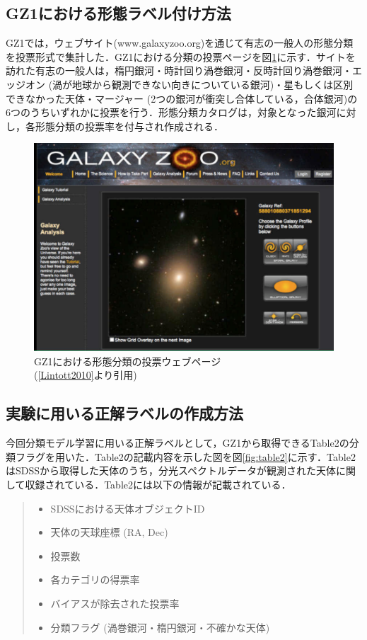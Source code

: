 \documentclass[a4j, 11pt]{jreport}
\begin{document}
\subsection*{GZ1における形態ラベル付け方法}
GZ1では，ウェブサイト(www.galaxyzoo.org)を通じて有志の一般人の形態分類を投票形式で集計した．GZ1における分類の投票ページを図\ref{fig:gz1_website}に示す．サイトを訪れた有志の一般人は，楕円銀河・時計回り渦巻銀河・反時計回り渦巻銀河・エッジオン (渦が地球から観測できない向きについている銀河)・星もしくは区別できなかった天体・マージャー (2つの銀河が衝突し合体している，合体銀河)の6つのうちいずれかに投票を行う．形態分類カタログは，対象となった銀河に対し，各形態分類の投票率を付与され作成される．

\begin{figure}[h]
 \centering
 \includegraphics[width=12cm]{images/gz1_website.png}
 \caption{GZ1における形態分類の投票ウェブページ\\(\ref{Lintott2010}より引用)}
 \label{fig:gz1_website}
\end{figure}

\subsection*{実験に用いる正解ラベルの作成方法}
今回分類モデル学習に用いる正解ラベルとして，GZ1から取得できるTable2の分類フラグを用いた．Table2の記載内容を示した図を図\ref{fig:table2}に示す．Table2はSDSSから取得した天体のうち，分光スペクトルデータが観測された天体に関して収録されている．Table2には以下の情報が記載されている．

\begin{quote}
 \begin{itemize}
	\item SDSSにおける天体オブジェクトID
	\item 天体の天球座標 (RA, Dec)
	\item 投票数
	\item 各カテゴリの得票率
	\item バイアスが除去された投票率
	\item 分類フラグ (渦巻銀河・楕円銀河・不確かな天体)
 \end{itemize}
\end{quote}
\end{document}
